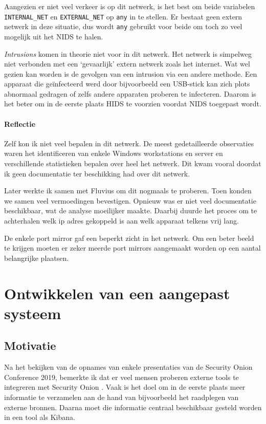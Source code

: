 \documentclass[a4paper,12pt]{report}
\begin{document}
Aangezien er niet veel verkeer is op dit netwerk, is het best om beide variabelen \lstinline|INTERNAL_NET| en \lstinline|EXTERNAL_NET| op \lstinline|any| in te stellen.
Er bestaat geen extern netwerk in deze situatie, dus wordt \lstinline|any| gebruikt voor beide om toch zo veel mogelijk uit het NIDS te halen.

\emph{Intrusions} komen in theorie niet voor in dit netwerk.
Het netwerk is simpelweg niet verbonden met een `gevaarlijk' extern netwerk zoals het internet.
Wat wel gezien kan worden is de gevolgen van een intrusion via een andere methode.
Een apparaat die geïnfecteerd werd door bijvoorbeeld een USB-stick kan zich plots abnormaal gedragen of zelfs andere apparaten proberen te infecteren.
Daarom is het beter om in de eerste plaats HIDS te voorzien voordat NIDS toegepast wordt.


\subsubsection{Reflectie}
Zelf kon ik niet veel bepalen in dit netwerk.
De meest gedetailleerde observaties waren het identificeren van enkele Windows workstations en server en verschillende statistieken bepalen over heel het netwerk.
Dit kwam vooral doordat ik geen documentatie ter beschikking had over dit netwerk.

Later werkte ik samen met Fluvius om dit nogmaals te proberen.
Toen konden we samen veel vermoedingen bevestigen.
Opnieuw was er niet veel documentatie beschikbaar, wat de analyse moeilijker maakte.
Daarbij duurde het proces om te achterhalen welk ip adres gekoppeld is aan welk apparaat telkens vrij lang.

De enkele port mirror gaf een beperkt zicht in het netwerk.
Om een beter beeld te krijgen moeten er zeker meerde port mirrors aangemaakt worden op een aantal belangrijke plaatsen.

\chapter{Ontwikkelen van een aangepast systeem}
\label{sec:aangepast-systeem}
\section{Motivatie}
Na het bekijken van de opnames van enkele presentaties van de Security Onion Conference 2019, bemerkte ik dat er veel mensen proberen externe tools te integreren met Security Onion \autocite{so:conference-2019}.
Vaak is het doel om in de eerste plaats meer informatie te verzamelen aan de hand van bijvoorbeeld het raadplegen van externe bronnen.
Daarna moet die informatie centraal beschikbaar gesteld worden in een tool als Kibana.
\end{document}
